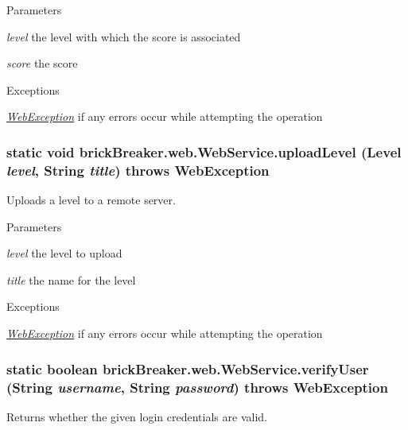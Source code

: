 \begin{DoxyParams}{Parameters}
\item[{\em level}]the level with which the score is associated \item[{\em score}]the score\end{DoxyParams}

\begin{DoxyExceptions}{Exceptions}
\item[{\em \hyperlink{classbrick_breaker_1_1web_1_1_web_exception}{WebException}}]if any errors occur while attempting the operation \end{DoxyExceptions}
\hypertarget{classbrick_breaker_1_1web_1_1_web_service_ae6a847822ec25d4383104f83896c528d}{
\subsubsection[{uploadLevel}]{\setlength{\rightskip}{0pt plus 5cm}static void brickBreaker.web.WebService.uploadLevel ({\bf Level} {\em level}, \/  String {\em title})  throws {\bf WebException} }}
\label{classbrick_breaker_1_1web_1_1_web_service_ae6a847822ec25d4383104f83896c528d}
Uploads a level to a remote server.


\begin{DoxyParams}{Parameters}
\item[{\em level}]the level to upload \item[{\em title}]the name for the level\end{DoxyParams}

\begin{DoxyExceptions}{Exceptions}
\item[{\em \hyperlink{classbrick_breaker_1_1web_1_1_web_exception}{WebException}}]if any errors occur while attempting the operation \end{DoxyExceptions}
\hypertarget{classbrick_breaker_1_1web_1_1_web_service_a8643c4061b5d45c94fb04bd7f8e7a6c1}{
\subsubsection[{verifyUser}]{\setlength{\rightskip}{0pt plus 5cm}static boolean brickBreaker.web.WebService.verifyUser (String {\em username}, \/  String {\em password})  throws {\bf WebException} }}
\label{classbrick_breaker_1_1web_1_1_web_service_a8643c4061b5d45c94fb04bd7f8e7a6c1}
Returns whether the given login credentials are valid.


